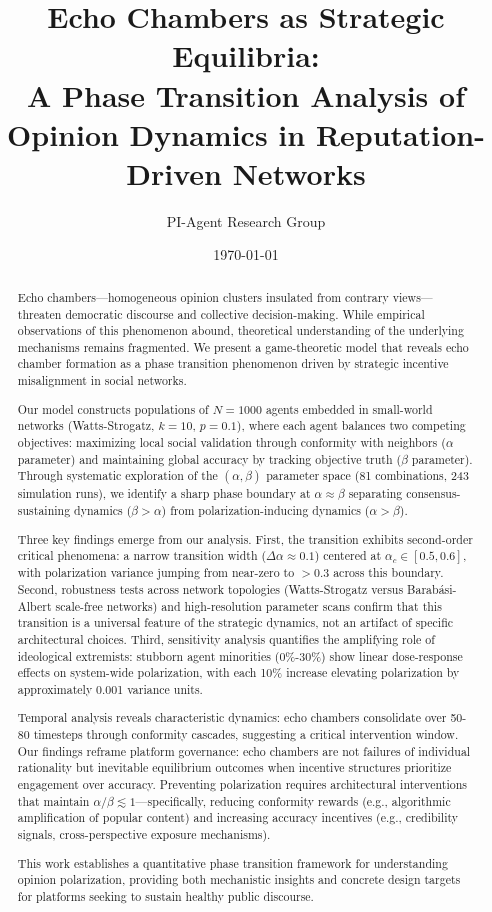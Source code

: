 \documentclass[11pt,a4paper]{article}
\title{Echo Chambers as Strategic Equilibria: \\
A Phase Transition Analysis of Opinion Dynamics in Reputation-Driven Networks}
\author{PI-Agent Research Group}
\date{\today}
\begin{document}
\maketitle

\begin{abstract}
Echo chambers—homogeneous opinion clusters insulated from contrary views—threaten democratic discourse and collective decision-making. While empirical observations of this phenomenon abound, theoretical understanding of the underlying mechanisms remains fragmented. We present a game-theoretic model that reveals echo chamber formation as a phase transition phenomenon driven by strategic incentive misalignment in social networks.

Our model constructs populations of $N=1000$ agents embedded in small-world networks (Watts-Strogatz, $k=10$, $p=0.1$), where each agent balances two competing objectives: maximizing local social validation through conformity with neighbors ($\alpha$ parameter) and maintaining global accuracy by tracking objective truth ($\beta$ parameter). Through systematic exploration of the $(\alpha, \beta)$ parameter space (81 combinations, 243 simulation runs), we identify a sharp phase boundary at $\alpha \approx \beta$ separating consensus-sustaining dynamics ($\beta > \alpha$) from polarization-inducing dynamics ($\alpha > \beta$).

Three key findings emerge from our analysis. First, the transition exhibits second-order critical phenomena: a narrow transition width ($\Delta\alpha \approx 0.1$) centered at $\alpha_c \in [0.5, 0.6]$, with polarization variance jumping from near-zero to $>0.3$ across this boundary. Second, robustness tests across network topologies (Watts-Strogatz versus Barabási-Albert scale-free networks) and high-resolution parameter scans confirm that this transition is a universal feature of the strategic dynamics, not an artifact of specific architectural choices. Third, sensitivity analysis quantifies the amplifying role of ideological extremists: stubborn agent minorities (0\%-30\%) show linear dose-response effects on system-wide polarization, with each 10\% increase elevating polarization by approximately 0.001 variance units.

Temporal analysis reveals characteristic dynamics: echo chambers consolidate over 50-80 timesteps through conformity cascades, suggesting a critical intervention window. Our findings reframe platform governance: echo chambers are not failures of individual rationality but inevitable equilibrium outcomes when incentive structures prioritize engagement over accuracy. Preventing polarization requires architectural interventions that maintain $\alpha/\beta \lesssim 1$—specifically, reducing conformity rewards (e.g., algorithmic amplification of popular content) and increasing accuracy incentives (e.g., credibility signals, cross-perspective exposure mechanisms).

This work establishes a quantitative phase transition framework for understanding opinion polarization, providing both mechanistic insights and concrete design targets for platforms seeking to sustain healthy public discourse.
\end{abstract}
\end{document}
